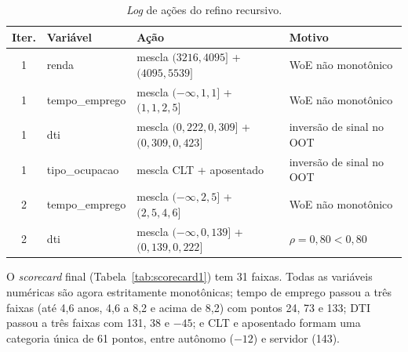 \documentclass[11pt,a4paper]{article}
\begin{document}
\begin{table}[H]
\centering\small
\caption{\emph{Log} de ações do refino recursivo.}
\label{tab:log}
\begin{tabular}{clll}
\toprule
Iter. & Variável & Ação & Motivo \\
\midrule
1 & renda & mescla $(3216, 4095]$ + $(4095, 5539]$ & WoE não monotônico \\
1 & tempo\_emprego & mescla $(-\infty, 1{,}1]$ + $(1{,}1, 2{,}5]$ & WoE não monotônico \\
1 & dti & mescla $(0{,}222, 0{,}309]$ + $(0{,}309, 0{,}423]$ & inversão de sinal no OOT \\
1 & tipo\_ocupacao & mescla CLT + aposentado & inversão de sinal no OOT \\
2 & tempo\_emprego & mescla $(-\infty, 2{,}5]$ + $(2{,}5, 4{,}6]$ & WoE não monotônico \\
2 & dti & mescla $(-\infty, 0{,}139]$ + $(0{,}139, 0{,}222]$ & $\rho=0{,}80<0{,}80$ \\
\bottomrule
\end{tabular}
\end{table}

O \emph{scorecard} final (Tabela~\ref{tab:scorecard1}) tem 31 faixas. Todas as variáveis numéricas são agora estritamente monotônicas; tempo de emprego passou a três faixas (até 4{,}6 anos, 4{,}6 a 8{,}2 e acima de 8{,}2) com pontos 24, 73 e 133; DTI passou a três faixas com 131, 38 e $-45$; e CLT e aposentado formam uma categoria única de 61 pontos, entre autônomo ($-12$) e servidor (143).
\end{document}
